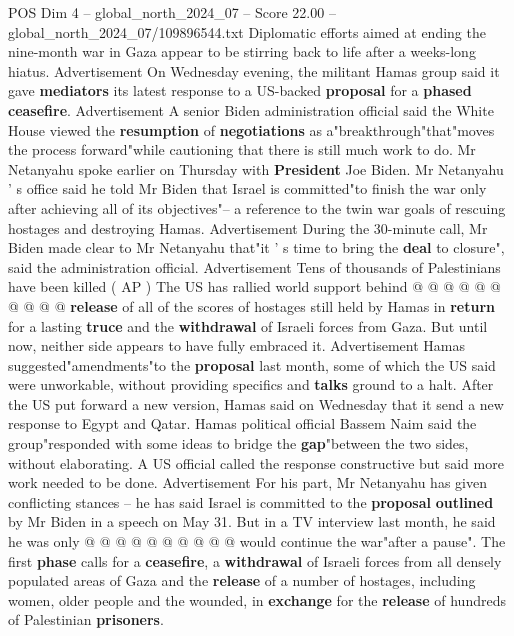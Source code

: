 \begin{textsample}{POS Dim 4 – global\_north\_2024\_07 – Score 22.00 – global\_north\_2024\_07/109896544.txt}  \label{ex:f4_pos_179}
Diplomatic efforts aimed at ending the nine-month war in Gaza appear to be stirring back to life after a weeks-long hiatus.
Advertisement On Wednesday evening, the militant Hamas group said it gave \textbf{mediators} its latest response to a US-backed \textbf{proposal} for a \textbf{phased} \textbf{ceasefire}.
Advertisement A senior Biden administration official said the White House viewed the \textbf{resumption} of \textbf{negotiations} as a"breakthrough"that"moves the process forward"while cautioning that there is still much work to do.
Mr Netanyahu spoke earlier on Thursday with \textbf{President} Joe Biden.
Mr Netanyahu ' s office said he told Mr Biden that Israel is committed"to finish the war only after achieving all of its objectives"-- a reference to the twin war goals of rescuing hostages and destroying Hamas.
Advertisement During the 30-minute call, Mr Biden made clear to Mr Netanyahu that"it ' s time to bring the \textbf{deal} to closure", said the administration official.
Advertisement Tens of thousands of Palestinians have been killed ( AP ) The US has rallied world support behind @ @ @ @ @ @ @ @ @ @ \textbf{release} of all of the scores of hostages still held by Hamas in \textbf{return} for a lasting \textbf{truce} and the \textbf{withdrawal} of Israeli forces from Gaza.
But until now, neither side appears to have fully embraced it.
Advertisement Hamas suggested"amendments"to the \textbf{proposal} last month, some of which the US said were unworkable, without providing specifics and \textbf{talks} ground to a halt.
After the US put forward a new version, Hamas said on Wednesday that it send a new response to Egypt and Qatar.
Hamas political official Bassem Naim said the group"responded with some ideas to bridge the \textbf{gap}"between the two sides, without elaborating.
A US official called the response constructive but said more work needed to be done.
Advertisement For his part, Mr Netanyahu has given conflicting stances -- he has said Israel is committed to the \textbf{proposal} \textbf{outlined} by Mr Biden in a speech on May 31.
But in a TV interview last month, he said he was only @ @ @ @ @ @ @ @ @ @ would continue the war"after a pause".
The first \textbf{phase} calls for a \textbf{ceasefire}, a \textbf{withdrawal} of Israeli forces from all densely populated areas of Gaza and the \textbf{release} of a number of hostages, including women, older people and the wounded, in \textbf{exchange} for the \textbf{release} of hundreds of Palestinian \textbf{prisoners}.

\end{textsample}
